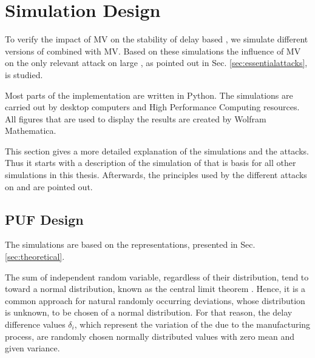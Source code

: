 \chapter{Simulation Design}
\label{cap:simulationdesign}

To verify the impact of \ac{MV} on the stability of delay based \pufs, we simulate different versions of \apufs combined with \ac{MV}.
Based on these simulations the influence of \ac{MV} on the only relevant attack on large \xpufs, as pointed out in Sec. \ref{sec:essentialattacks}, is studied.

Most parts of the implementation are written in Python. 
The simulations are carried out by desktop computers and High Performance Computing resources. 
All figures that are used to display the results are created by Wolfram Mathematica.

This section gives a more detailed explanation of the simulations and the attacks.
Thus it starts with a description of the simulation of \apufs that is basis for all other \puf simulations in this thesis.
Afterwards, the principles used by the different attacks on \mpufs and \mxpufs are pointed out.



\section{\ac{PUF} Design}
\label{sec:pufsimulation}

The \apuf simulations are based on the \apuf representations, presented in Sec. \ref{sec:theoretical}.

The sum of independent random variable, regardless of their distribution, tend to toward a normal distribution, known as the central limit theorem \cite{Wikipedia2017CentralTheorem}.
Hence, it is a common approach for natural randomly occurring deviations, whose distribution is unknown, to be chosen of a normal distribution.
For that reason, the delay difference values $\delta_i$, which represent the variation of the \apuf due to the manufacturing process, are randomly chosen normally distributed values with zero mean and given variance. %

